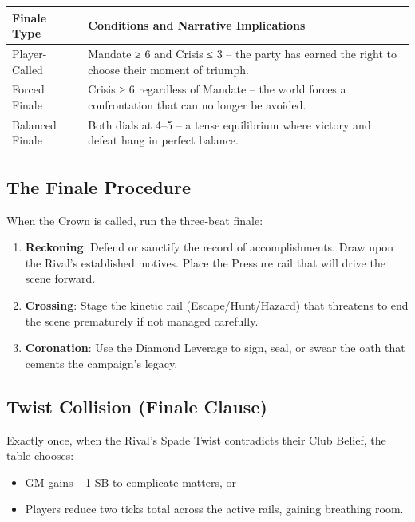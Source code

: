 \begin{fatebox}
\begin{tabularx}{\textwidth}{lX}
\toprule
\textbf{Finale Type} & \textbf{Conditions and Narrative Implications} \\
\midrule
Player-Called & Mandate ≥ 6 and Crisis ≤ 3 – the party has earned the right to choose their moment of triumph. \\
Forced Finale & Crisis ≥ 6 regardless of Mandate – the world forces a confrontation that can no longer be avoided. \\
Balanced Finale & Both dials at 4–5 – a tense equilibrium where victory and defeat hang in perfect balance. \\
\bottomrule
\end{tabularx}
\end{fatebox}

\subsection{The Finale Procedure}
\label{subsec:finale-procedure}

When the Crown is called, run the three‑beat finale:
\begin{enumerate}
  \item \textbf{Reckoning}: Defend or sanctify the record of accomplishments. Draw upon the Rival’s established motives. Place the Pressure rail that will drive the scene forward.
  \item \textbf{Crossing}: Stage the kinetic rail (Escape/Hunt/Hazard) that threatens to end the scene prematurely if not managed carefully.
  \item \textbf{Coronation}: Use the Diamond Leverage to sign, seal, or swear the oath that cements the campaign’s legacy.
\end{enumerate}

\subsection{Twist Collision (Finale Clause)}
\label{subsec:twist-collision}

Exactly once, when the Rival’s Spade Twist contradicts their Club Belief, the table chooses:
\begin{itemize}
  \item GM gains +1 SB to complicate matters, or
  \item Players reduce two ticks total across the active rails, gaining breathing room.
\end{itemize}

